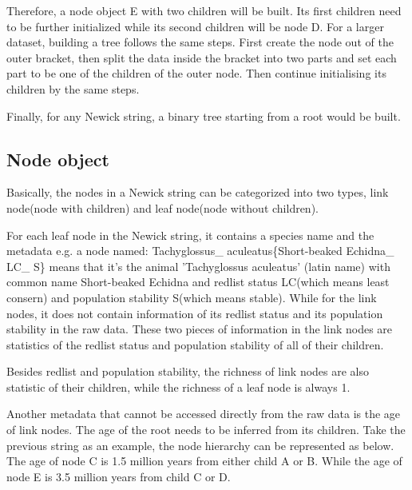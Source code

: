 \documentclass[MSc]{icldt}
\begin{document}
Therefore, a node object E with two children will be built. Its first children need to be further initialized while its second children will be node D. For a larger dataset, building a tree follows the same steps. First create the node out of the outer bracket, then split the data inside the bracket into two parts and set each part to be one of the children of the outer node. Then continue initialising its children by the same steps.

Finally, for any Newick string, a binary tree starting from a root would be built. 

\subsection{Node object}

Basically, the nodes in a Newick string can be categorized into two types, link node(node with children) and leaf node(node without children).

For each leaf node in the Newick string, it contains a species name and the metadata e.g. a node named: Tachyglossus\_ aculeatus\{Short-beaked Echidna\_ LC\_ S\} means that it's the animal 'Tachyglossus aculeatus' (latin name) with common name Short-beaked Echidna and redlist status LC(which means least consern) and population stability S(which means stable). While for the link nodes, it does not contain information of its redlist status and its population stability in the raw data. These two pieces of information in the link nodes are statistics of the redlist status and population stability of all of their children. 

Besides redlist and population stability, the richness of link nodes are also statistic of their children, while the richness of a leaf node is always 1. 

Another metadata that cannot be accessed directly from the raw data is the age of link nodes. The age of the root needs to be inferred from its children. Take the previous string as an example, the node hierarchy can be represented as below. The age of node C is 1.5 million years from either child A or B. While the age of node E is 3.5 million years from child C or D.

\begin{center}
\end{center}
\end{document}
